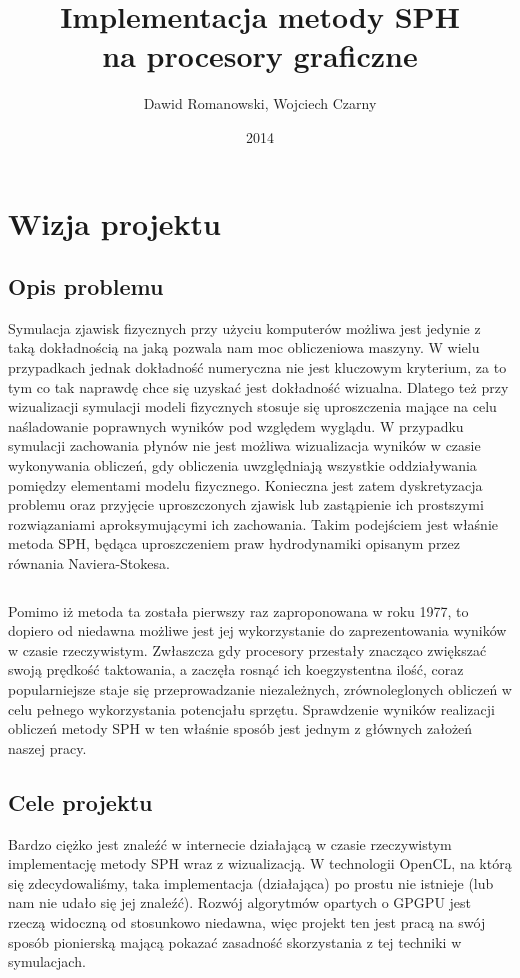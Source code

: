 \documentclass[polish, 12pt]{aghthesis}
\author{Dawid Romanowski, Wojciech Czarny}
\title{Implementacja metody SPH \\ na procesory graficzne}
\date{2014}
\begin{document}
\raggedbottom
\maketitle{}

\tableofcontents
\clearpage

\section{Wizja projektu}


	\subsection{Opis problemu}
	
	Symulacja zjawisk fizycznych przy użyciu komputerów możliwa jest jedynie z taką dokładnością na jaką pozwala nam moc obliczeniowa maszyny. W wielu przypadkach jednak dokładność numeryczna nie jest kluczowym kryterium, za to tym co tak naprawdę chce się uzyskać jest dokładność wizualna. Dlatego też przy wizualizacji symulacji modeli fizycznych stosuje się uproszczenia mające na celu naśladowanie poprawnych wyników pod względem wyglądu. W przypadku symulacji zachowania płynów nie jest możliwa wizualizacja wyników w czasie wykonywania obliczeń, gdy obliczenia uwzględniają wszystkie oddziaływania pomiędzy elementami modelu fizycznego. Konieczna jest zatem dyskretyzacja problemu oraz przyjęcie uproszczonych zjawisk lub zastąpienie ich prostszymi rozwiązaniami aproksymującymi ich zachowania. Takim podejściem jest właśnie metoda SPH, będąca uproszczeniem praw hydrodynamiki opisanym przez równania Naviera-Stokesa.
	
	$\,$
	
	Pomimo iż metoda ta została pierwszy raz zaproponowana w roku 1977, to dopiero od niedawna możliwe jest jej wykorzystanie do zaprezentowania wyników w czasie rzeczywistym. Zwłaszcza gdy procesory przestały znacząco zwiększać swoją prędkość taktowania, a zaczęła rosnąć ich koegzystentna ilość, coraz popularniejsze staje się przeprowadzanie niezależnych, zrównoleglonych obliczeń w celu pełnego wykorzystania potencjału sprzętu. Sprawdzenie wyników realizacji obliczeń metody SPH w ten właśnie sposób jest jednym z głównych założeń naszej pracy.
	
	\subsection{Cele projektu}
	
	Bardzo ciężko jest znaleźć w internecie działającą w czasie rzeczywistym implementację metody SPH wraz z wizualizacją. W technologii OpenCL, na którą się zdecydowaliśmy, taka implementacja (działająca) po prostu nie istnieje (lub nam nie udało się jej znaleźć). Rozwój algorytmów opartych o GPGPU jest rzeczą widoczną od stosunkowo niedawna, więc projekt ten jest pracą na swój sposób pionierską mającą pokazać zasadność skorzystania z tej techniki w symulacjach.
		
\end{document}
